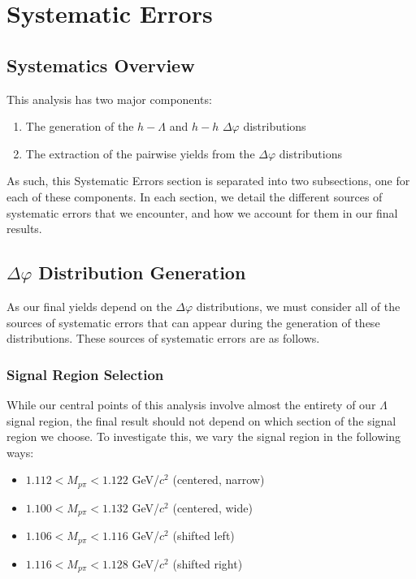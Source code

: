 \documentclass[ALICE,manyauthors]{ALICE_analysis_notes}
\begin{document}
\clearpage

\section{Systematic Errors}
\label{systematics}
\subsection{Systematics Overview}
This analysis has two major components:
\begin{enumerate}
\item The generation of the $h-\Lambda$ and $h-h$ $\Delta\varphi$ distributions
\item The extraction of the pairwise yields from the $\Delta\varphi$ distributions
\end{enumerate}

As such, this Systematic Errors section is separated into two subsections, one for each of these components. In each section, we detail the different sources of systematic errors that we encounter, and how we account for them in our final results.


\subsection{$\Delta\varphi$ Distribution Generation}
As our final yields depend on the $\Delta\varphi$ distributions, we must consider all of the sources of systematic errors that can appear during the generation of these distributions. These sources of systematic errors are as follows.

\subsubsection{Signal Region Selection}
While our central points of this analysis involve almost the entirety of our $\Lambda$ signal region, the final result should not depend on which section of the signal region we choose. To investigate this, we vary the signal region in the following ways:

\begin{itemize}
\item $1.112 < M_{p\pi} < 1.122$ GeV/$c^2$ (centered, narrow)
\item $1.100 < M_{p\pi} < 1.132$ GeV/$c^2$ (centered, wide)
\item $1.106 < M_{p\pi} < 1.116$ GeV/$c^2$ (shifted left)
\item $1.116 < M_{p\pi} < 1.128$ GeV/$c^2$ (shifted right)
\end{itemize}
\end{document}
